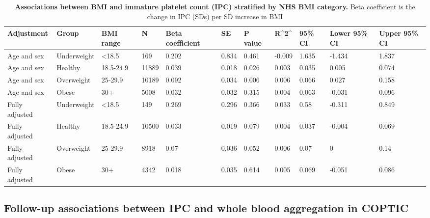 \documentclass[11pt,twoside]{bristolthesis}
\begin{document}
\begin{landscape}\begin{table}

\caption[Associations between BMI and immature platelet count (IPC) stratified by NHS BMI category]{\label{tab:BMI-platelets-stratified}\textbf{Associations between BMI and immature platelet count (IPC) stratified by NHS BMI category.} Beta coefficient is the change in IPC (SDs) per SD increase in BMI}
\centering
\begin{tabu} to 
\toprule
Adjustment & Group & BMI range & N & Beta coefficient & SE & P value & R\textasciicircum{}2\textasciicircum{} & 95\% CI & Lower 95\% CI & Upper 95\% CI\\
\midrule
Age and sex & Underweight & <18.5 & 169 & 0.202 & 0.834 & 0.461 & -0.009 & 1.635 & -1.434 & 1.837\\
Age and sex & Healthy & 18.5-24.9 & 11889 & 0.039 & 0.018 & 0.026 & 0.003 & 0.035 & 0.005 & 0.074\\
Age and sex & Overweight & 25-29.9 & 10189 & 0.092 & 0.034 & 0.006 & 0.006 & 0.066 & 0.027 & 0.158\\
Age and sex & Obese & 30+ & 5008 & 0.032 & 0.032 & 0.315 & 0.004 & 0.063 & -0.031 & 0.096\\
Fully adjusted & Underweight & <18.5 & 149 & 0.269 & 0.296 & 0.366 & 0.033 & 0.58 & -0.311 & 0.849\\
\addlinespace
Fully adjusted & Healthy & 18.5-24.9 & 10500 & 0.033 & 0.019 & 0.079 & 0.004 & 0.037 & -0.004 & 0.069\\
Fully adjusted & Overweight & 25-29.9 & 8918 & 0.07 & 0.036 & 0.052 & 0.006 & 0.07 & 0 & 0.14\\
Fully adjusted & Obese & 30+ & 4342 & 0.018 & 0.035 & 0.614 & 0.005 & 0.069 & -0.051 & 0.086\\
\bottomrule
\end{tabu}
\end{table}
\end{landscape}
\hypertarget{follow-up-associations-between-ipc-and-whole-blood-aggregation-in-coptic}{%
\subsection{Follow-up associations between IPC and whole blood aggregation in COPTIC}\label{follow-up-associations-between-ipc-and-whole-blood-aggregation-in-coptic}}
\end{document}
